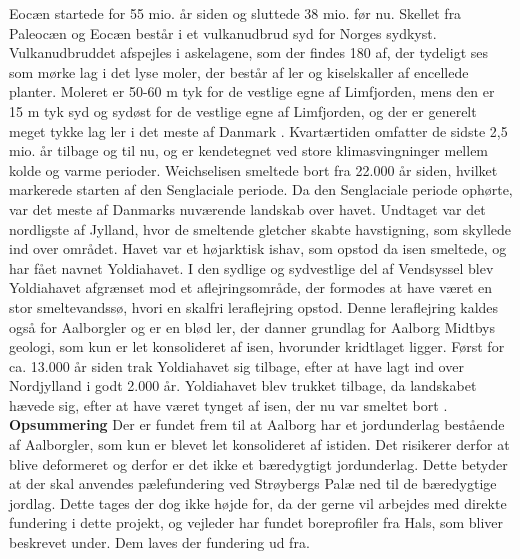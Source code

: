 \newline \indent{     }  Eocæn startede for 55 mio. år siden og sluttede 38 mio. før nu. Skellet fra Paleocæn og Eocæn består i et vulkanudbrud syd for Norges sydkyst. Vulkanudbruddet afspejles i askelagene, som der findes 180 af, der tydeligt ses som mørke lag i det lyse moler, der består af ler og kiselskaller af encellede planter. Moleret er 50-60 m tyk for de vestlige egne af Limfjorden, mens den er 15 m tyk syd og sydøst for de vestlige egne af Limfjorden, og der er generelt meget tykke lag ler i det meste af Danmark \citep{geopdf}.
\newline
\newline
Kvartærtiden omfatter de sidste 2,5 mio. år tilbage og til nu, og er kendetegnet ved store klimasvingninger mellem kolde og varme perioder. Weichselisen smeltede bort fra 22.000 år siden, hvilket markerede starten af den Senglaciale periode. Da den Senglaciale periode ophørte, var det meste af Danmarks nuværende landskab over havet. Undtaget var det nordligste af Jylland, hvor de smeltende gletcher skabte havstigning, som skyllede ind over området. Havet var et højarktisk ishav, som opstod da isen smeltede, og har fået navnet Yoldiahavet. I den sydlige og sydvestlige del af Vendsyssel blev Yoldiahavet afgrænset mod et aflejringsområde, der formodes at have været en stor smeltevandssø, hvori en skalfri leraflejring opstod. Denne leraflejring kaldes også for Aalborgler og er en blød ler, der danner grundlag for Aalborg Midtbys geologi, som kun er let konsolideret af isen, hvorunder kridtlaget ligger. Først for ca. 13.000 år siden trak Yoldiahavet sig tilbage, efter at have lagt ind over Nordjylland i godt 2.000 år. Yoldiahavet blev trukket tilbage, da landskabet hævede sig, efter at have været tynget af isen, der nu var smeltet bort \citep{geopdf}.
\newline
\newline
\textbf{Opsummering}
\newline
Der er fundet frem til at Aalborg har et jordunderlag bestående af Aalborgler, som kun er blevet let konsolideret af istiden. Det risikerer derfor at  blive deformeret og derfor er det ikke et bæredygtigt jordunderlag. Dette betyder at der skal anvendes pælefundering ved Strøybergs Palæ ned til de bæredygtige jordlag. Dette tages der dog ikke højde for, da der gerne vil arbejdes med direkte fundering i dette projekt, og vejleder har fundet boreprofiler fra Hals, som bliver beskrevet under. Dem laves der fundering ud fra. 


